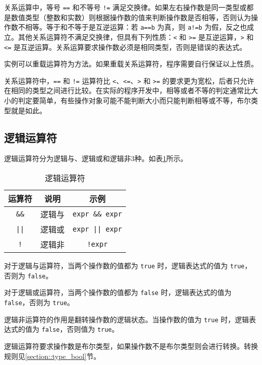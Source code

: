关系运算中，等号 \texttt{==} 和不等号 \texttt{!=} 满足交换律。如果左右操作数是同一类型或都是数值类型（整数和实数）则根据操作数的值来判断操作数是否相等，否则认为操作数不相等。等于和不等于是互逆运算：若 \texttt{a==b} 为真，则 \texttt{a!=b} 为假，反之也成立。其他关系运算符不满足交换律，但具有下列性质：\texttt{<} 和 \texttt{>=} 是互逆运算，\texttt{>} 和 \texttt{<=} 是互逆运算。关系运算要求操作数必须是相同类型，否则是错误的表达式。

实例可以重载运算符为方法。如果重载关系运算符，程序需要自行保证以上性质。

关系运算符中，\texttt{==} 和 \texttt{!=} 运算符比 \texttt{<}、\texttt{<=}、\texttt{>} 和 \texttt{>=} 的要求更为宽松，后者只允许在相同的类型之间进行比较。在实际的程序开发中，相等或者不等的判定通常比大小的判定要简单，有些操作对象可能不能判断大小而只能判断相等或不等，布尔类型就是如此。

\subsection{逻辑运算符}

逻辑运算符分为逻辑与、逻辑或和逻辑非3种。如表\ref{tab::logic_operator}所示。

\begin{table}[htb]
    \centering
    \setlength{\tabcolsep}{10mm}
    \begin{tabular}{ccc} \toprule
        \textbf{运算符} & \textbf{说明} & \textbf{示例} \\ \midrule
        \texttt{\&\&} & 逻辑与 & \texttt{expr \&\& expr} \\
        \texttt{||} & 逻辑或 & \texttt{expr || expr} \\
        \texttt{!} & 逻辑非 & \texttt{!expr} \\
        \bottomrule
    \end{tabular}
    \caption{逻辑运算符}
    \label{tab::logic_operator}
\end{table}

对于逻辑与运算符，当两个操作数的值都为 \texttt{true} 时，逻辑表达式的值为 \texttt{true}，否则为 \texttt{false}。

对于逻辑或运算符，当两个操作数的值都为 \texttt{false} 时，逻辑表达式的值为 \texttt{false}，否则为 \texttt{true}。

逻辑非运算符的作用是翻转操作数的逻辑状态。当操作数的值为 \texttt{true} 时，逻辑表达式的值为 \texttt{false}，否则值为 \texttt{true}。

逻辑运算符要求操作数是布尔类型，如果操作数不是布尔类型则会进行转换。转换规则见\ref{section::type_bool}节。

